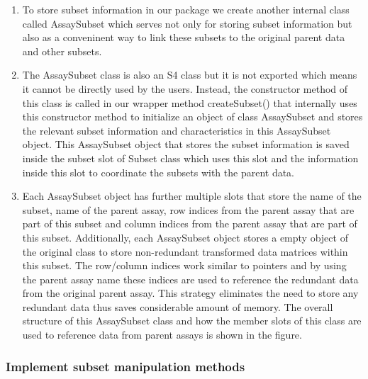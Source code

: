 \documentclass[
]{article}
\providecommand{\tightlist}{%
  \setlength{\itemsep}{0pt}\setlength{\parskip}{0pt}}
\begin{document}
\begin{enumerate}
\def\labelenumi{\arabic{enumi}.}
\tightlist
\item
  To store subset information in our package we create another internal
  class called AssaySubset which serves not only for storing subset
  information but also as a conveninent way to link these subsets to the
  original parent data and other subsets.
\item
  The AssaySubset class is also an S4 class but it is not exported which
  means it cannot be directly used by the users. Instead, the
  constructor method of this class is called in our wrapper method
  createSubset() that internally uses this constructor method to
  initialize an object of class AssaySubset and stores the relevant
  subset information and characteristics in this AssaySubset object.
  This AssaySubset object that stores the subset information is saved
  inside the subset slot of Subset class which uses this slot and the
  information inside this slot to coordinate the subsets with the parent
  data.
\item
  Each AssaySubset object has further multiple slots that store the name
  of the subset, name of the parent assay, row indices from the parent
  assay that are part of this subset and column indices from the parent
  assay that are part of this subset. Additionally, each AssaySubset
  object stores a empty object of the original class to store
  non-redundant transformed data matrices within this subset. The
  row/column indices work similar to pointers and by using the parent
  assay name these indices are used to reference the redundant data from
  the original parent assay. This strategy eliminates the need to store
  any redundant data thus saves considerable amount of memory. The
  overall structure of this AssaySubset class and how the member slots
  of this class are used to reference data from parent assays is shown
  in the figure.
\end{enumerate}

\hypertarget{implement-subset-manipulation-methods}{%
\subsubsection{Implement subset manipulation
methods}\label{implement-subset-manipulation-methods}}
\end{document}
